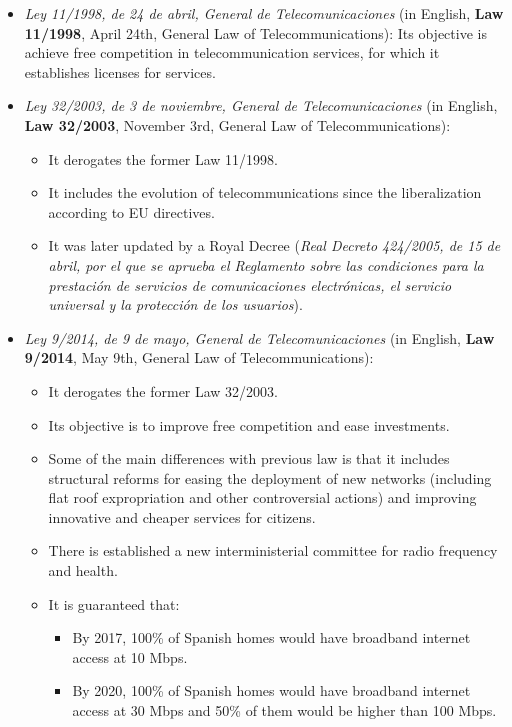\documentclass[
	12pt,
	twoside
]{book}
\begin{document}
\begin{itemize}

	\item \textit{Ley 11/1998, de 24 de abril, General de Telecomunicaciones} (in English, \textbf{Law 11/1998}, April 24th, General Law of Telecommunications): Its objective is achieve free competition in telecommunication services, for which it establishes licenses for services.

	\item {
		\textit{Ley 32/2003, de 3 de noviembre, General de Telecomunicaciones} (in English, \textbf{Law 32/2003}, November 3rd, General Law of Telecommunications):
		\begin{itemize}
			\item It derogates the former Law 11/1998.
			\item It includes the evolution of telecommunications since the liberalization according to EU directives.
			\item It was later updated by a Royal Decree (\textit{Real Decreto 424/2005, de 15 de abril, por el que se aprueba el Reglamento sobre las condiciones para la prestación de servicios de comunicaciones electrónicas, el servicio universal y la protección de los usuarios}).
		\end{itemize}
	}

	\item {
		\textit{Ley 9/2014, de 9 de mayo, General de Telecomunicaciones} (in English, \textbf{Law 9/2014}, May 9th, General Law of Telecommunications):
		\begin{itemize}
			\item It derogates the former Law 32/2003.
			\item Its objective is to improve free competition and ease investments.
			\item Some of the main differences with previous law is that it includes structural reforms for easing the deployment of new networks (including flat roof expropriation and other controversial actions) and improving innovative and cheaper services for citizens.
			\item There is established a new interministerial committee for radio frequency and health.
			\item {
				It is guaranteed that:
				\begin{itemize}
					\item By 2017, 100\% of Spanish homes would have broadband internet access at 10 Mbps.
					\item By 2020, 100\% of Spanish homes would have broadband internet access at 30 Mbps and 50\% of them would be higher than 100 Mbps.
				\end{itemize}
			}
		\end{itemize}
	}


\end{itemize}
\end{document}
